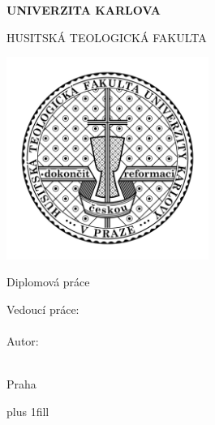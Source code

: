 

\pagestyle{empty}
\hypersetup{pageanchor=false}

\begin{center}

{\bf\Large UNIVERZITA KARLOVA}

\vfill

{\Large HUSITSKÁ TEOLOGICKÁ FAKULTA}

\vfill

\centerline{\mbox{\includegraphics[width=66mm]{rc/logo-htf.jpg}}}

\vfill

{\bfseries\NazevPrace}

\vfill

{\bfseries\NazevPraceEN}

\vfill

Diplomová práce

\vspace{15mm}

\begin{multicols}{2}
Vedoucí práce:\\
\Vedouci\\
\columnbreak
Autor:\\
\AutorPrace\\
\end{multicols}

\vfill

Praha \RokOdevzdani

\end{center}

\newpage


\openright
\hypersetup{pageanchor=true}
\pagestyle{plain}
\vglue 0pt plus 1fill

